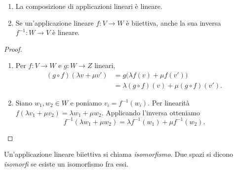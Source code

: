 \begin{proposizione}
\begin{enumerate}[label=\arabic*.]
\item La composizione di applicazioni lineari è lineare.
\item Se un'applicazione lineare $f:V\to W$ è biiettiva, anche la sua inversa $f^{-1}:W\to V$ è lineare.
\end{enumerate}
\end{proposizione}
\begin{proof}
\begin{enumerate}[label=\arabic*.]
\item {} Per $f:V\to W$ e $g:W\to Z$ lineari,
\begin{align*}
 (g\circ f)(\lambda v+\mu v')
 &=g\bigl(\lambda f(v)+\mu f(v')\bigr)\\
 &=\lambda(g\circ f)(v)+\mu(g\circ f)(v').
\end{align*}
\item {} Siano $w_1,w_2\in W$ e poniamo $v_i=f^{-1}(w_i)$. Per linearità $f(\lambda v_1+\mu v_2)=\lambda w_1+\mu w_2$. Applicando l'inversa otteniamo
\[
 f^{-1}(\lambda w_1+\mu w_2)=\lambda f^{-1}(w_1)+\mu f^{-1}(w_2).
\]
\end{enumerate}
\end{proof}
\begin{definizione}
Un'applicazione lineare biiettiva si chiama \emph{isomorfismo}. Due spazi si dicono \emph{isomorfi} se esiste un isomorfismo fra essi.
\end{definizione}

